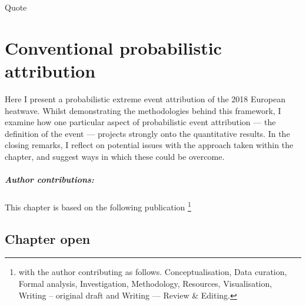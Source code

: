 {\onehalfspacing%
\begin{savequote}[8cm]
    Quote
\end{savequote}
    
\chapter{\label{ch2}Conventional probabilistic attribution} 

Here I present a probabilistic extreme event attribution of the 2018 European heatwave. Whilst demonstrating the methodologies behind this framework, I examine how one particular aspect of probabilistic event attribution --- the definition of the event --- projects strongly onto the quantitative results. In the closing remarks, I reflect on potential issues with the approach taken within the chapter, and suggest ways in which these could be overcome.
{\small\paragraph{Author contributions:} This chapter is based on the following publication \footnote{with the author contributing as follows. Conceptualisation, Data curation, Formal analysis, Investigation, Methodology, Resources, Visualisation, Writing -- original draft and Writing --- Review \& Editing.} \par\vspace{1em}
}

\clearpage

\minitoc

\clearpage}

\section{Chapter open}\label{ch2:open}

